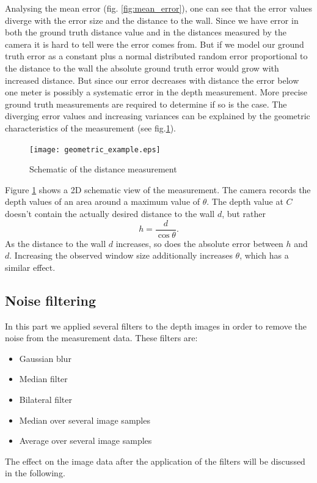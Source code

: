 \documentclass[DIV12,a4paper]{scrartcl}
\begin{document}
Analysing the mean error (fig. \ref{fig:mean_error}), one can see that the error values diverge with the error size and the distance to the wall. Since we have error in both the ground truth distance value and in the distances measured by the camera it is hard to tell were the error comes from. But if we model our ground truth error as a constant plus a normal distributed random error proportional to the distance to the wall the absolute ground truth error would grow with increased distance. But since our error decreases with distance the error below one meter is possibly a systematic error in the depth measurement. More precise ground truth measurements are required to determine if so is the case.
 The diverging error values and increasing variances can be explained by the geometric characteristics of the measurement (see fig.\ref{fig:geometric_representation}).
\begin{figure}[!ht]
  \centering
  \texttt{[image: geometric\_example.eps]}
  \caption{Schematic of the distance measurement}
  \label{fig:geometric_representation}
\end{figure}\par
Figure \ref{fig:geometric_representation} shows a 2D schematic view of the measurement. The camera records the depth values of an area around a maximum value of $\theta$. The depth value at $C$ doesn't contain the actually desired distance to the wall $d$, but rather\[ h=\frac{d}{\cos\theta}.\]
As the distance to the wall $d$ increases, so does the absolute error between $h$ and $d$. Increasing the observed window size additionally increases $\theta$, which has a similar effect.

\newpage
\subsection{Noise filtering}
\label{sec:filtering}
In this part we applied several filters to the depth images in order to remove the noise from the measurement data. These filters are:
\begin{itemize}
\item Gaussian blur
\item Median filter
\item Bilateral filter
\item Median over several image samples
\item Average over several image samples
\end{itemize}
The effect on the image data after the application of the filters will be discussed in the following.
\end{document}
